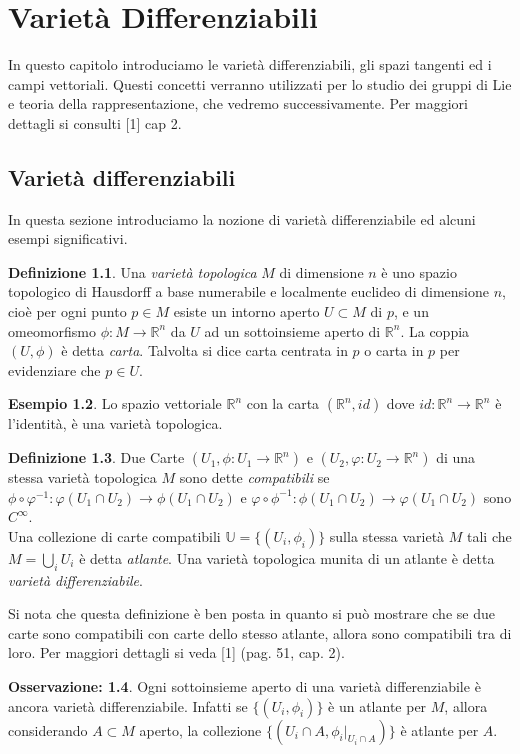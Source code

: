 \documentclass[12pt,a4paper]{report}
\theoremstyle{definition}
\newtheorem{Def}{Definizione}[chapter]
\theoremstyle{Theorem}
\theoremstyle{definition}
\newtheorem{Ex}[Def]{Esempio}
\theoremstyle{definition}
\theoremstyle{definition}
\newtheorem{Obs}[Def]{Osservazione:}
\begin{document}
\chapter{Varietà Differenziabili}
In questo capitolo introduciamo le varietà differenziabili, gli spazi tangenti ed i campi vettoriali. Questi concetti verranno utilizzati per lo studio dei gruppi di Lie e teoria della rappresentazione, che vedremo successivamente. Per maggiori dettagli si consulti [1] cap 2.
\section{Varietà differenziabili}
In questa sezione introduciamo la nozione di varietà differenziabile ed alcuni esempi significativi. 

\begin{Def}
	Una \textit{varietà topologica} $M$ di dimensione $n$ è uno spazio topologico di Hausdorff a base numerabile e localmente euclideo di dimensione $n$, cioè per ogni punto $p\in M$ esiste un intorno aperto $U\subset M$ di $p$, e un omeomorfismo $\phi:M\rightarrow\mathbb{R}^n$ da $U$ ad un sottoinsieme aperto di $\mathbb{R}^n$. La coppia $(U,\phi)$ è detta \textit{carta}. Talvolta si dice carta centrata in $p$ o carta in $p$ per evidenziare che $p\in U$. 
\end{Def}
\begin{Ex}
	Lo spazio vettoriale $\mathbb{R}^n$ con la carta $(\mathbb{R}^n, id)$ dove $id:\mathbb{R}^n\rightarrow \mathbb{R}^n$ è l'identità, è una varietà topologica. 
\end{Ex}
\begin{Def}
	Due Carte $(U_1,\phi:U_1\rightarrow\mathbb{R}^n)$ e $(U_2,\varphi:U_2\rightarrow\mathbb{R}^n)$ di una stessa varietà topologica $M$ sono dette \textit{compatibili} se
	$\phi\circ\varphi^{-1}:\varphi(U_1\cap U_2)\rightarrow \phi(U_1\cap U_2)$ e $\varphi\circ\phi^{-1}:\phi(U_1\cap U_2)\rightarrow \varphi(U_1\cap U_2)$ sono $C^\infty$.\\
	Una collezione di carte compatibili $\mathbb{U}=\{(U_i,\phi_{i})\}$ sulla stessa varietà $M$ tali che $M=\bigcup_i U_i$ è detta \textit{atlante}. Una varietà topologica munita di un atlante è detta \textit{varietà differenziabile}.
\end{Def}
Si nota che questa definizione è ben posta in quanto si può mostrare che se due carte sono compatibili con carte dello stesso atlante, allora sono compatibili tra di loro. Per maggiori dettagli si veda [1] (pag. 51, cap. 2).
\begin{Obs}\label{Obs:1.1.1}
Ogni sottoinsieme aperto di una varietà differenziabile è ancora varietà differenziabile. Infatti se $\{(U_i,\phi_i)\}$ è un atlante per $M$, allora considerando $A\subset M$ aperto, la collezione $\{(U_i\cap A,\phi_i|_{U_i\cap A})\}$ è atlante per $A$.
\end{Obs}
\end{document}
